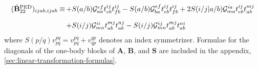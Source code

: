\begin{equation}
    \begin{array}{r@{\,}l}
        (\tilde{\mathbf{B}}_{22}^\mathrm{PED})_{ijab,ijab}
        \equiv
        &
        +
        S(a/b)
        \mathcal{G}_{aa}^{ef}
        t_{eb}^{ij}
        t_{fb}^{ij}
        -
        S(a/b)
        \mathcal{G}_{ba}^{ef}
        t_{eb}^{ij}
        t_{fb}^{ij}
        +
        2
        S(i/j|a/b)
        \mathcal{G}_{ma}^{ia}
        t_{eb}^{ij}
        t_{ab}^{mj}
        \\[10pt]
        &
        +
        S(i/j)
        \mathcal{G}_{mn}^{ii}
        t_{ab}^{mj}
        t_{ab}^{nj}
        -
        S(i/j)
        \mathcal{G}_{mn}^{ij}
        t_{ab}^{mj}
        t_{ab}^{ni}
    \end{array}
\end{equation}
where \(S(p/q)v_{pq}^{pq} = v_{pq}^{pq} + v_{qp}^{qp}\) denotes an index
symmetrizer.
Formulae for the diagonals of the one-body blocks of \(\mathbf{A}\),
\(\mathbf{B}\), and \(\mathbf{S}\) are included in the appendix,
\cref{sec:linear-transformation-formulas}.

